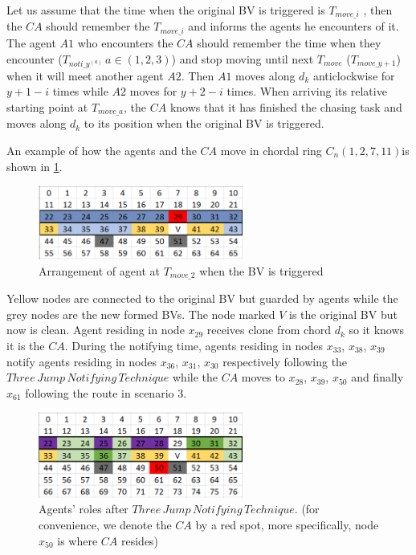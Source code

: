 Let us assume that the time when the original BV is triggered is $T_{move\_i}$ , then the $CA$ should remember the $T_{move\_i}$ and informs the agents he encounters of it. The agent $A1$ who encounters the $CA$ should remember the time when they encounter ($T_{noti\_y^{(a)}}\,a\in(1,2,3)$) and stop moving until next $T_{move}$ ($T_{move\_{y+1}}$) when it will meet another agent $A2$. Then $A1$ moves along $d_k$ anticlockwise for $y+1-i$ times while $A2$ moves for $y+2-i$ times. 
When arriving its relative starting point at $T_{move\_a}$, the $CA$ knows that it has finished the chasing task and moves along $d_k$ to its position when the original BV is triggered.

An example of how the agents and the $CA$ move in chordal ring $C_n(1, 2, 7, 11)$is shown in \ref{fig:T29}. 
\begin{figure}[H]
  \centering  
  \includegraphics[width=0.6\textwidth]{figures/T29.png}
  \caption{Arrangement of agent at $T_{move\_2}$ when the BV is triggered}\label{fig:T29}
\end{figure}

Yellow nodes are connected to the original BV but guarded by agents while the grey nodes are the new formed BVs. The node marked $V$ is the original BV but now is clean. Agent residing in node $x_{29}$ receives clone from chord $d_k$ so it knows it is the $CA$. During the notifying time, agents residing in nodes $x_{33}$, $x_{38}$, $x_{39}$ notify agents residing in nodes $x_{36}$, $x_{31}$, $x_{30}$ respectively following the $Three\,Jump\,Notifying\,Technique$ while the $CA$ moves to $x_{28}$, $x_{39}$, $x_{50}$ and finally $x_{61}$ following the route in scenario 3.

\begin{figure}[H]
  \centering  
  \includegraphics[width=0.6\textwidth]{figures/T50.png}
  \caption{Agents' roles after $Three\,Jump\,Notifying\,Technique$. (for convenience, we denote the $CA$ by a red spot, more specifically, node $x_{50}$ is where $CA$ resides)}\label{fig:T50}
\end{figure}

